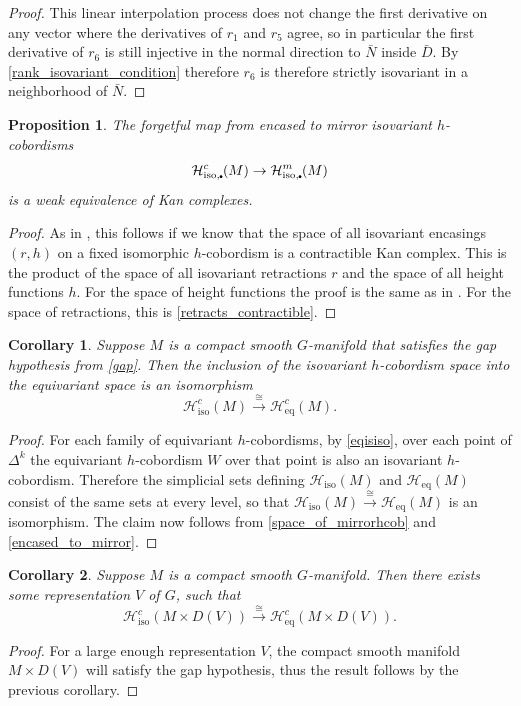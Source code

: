 \documentclass[11pt]{amsart}
\newtheorem{cor}{Corollary}[section]
\newtheorem{prop}{Proposition}[section]
\theoremstyle{definition}
\numberwithin{equation}{section}
\numberwithin{figure}{section}
\newcommand{\mc}{\mathcal}
\newcommand{\Hiso}{\mathcal{H}_{\iso}}
\newcommand{\iso}{\mathrm{iso}}
\newcommand{\eq}{\mathrm{eq}}
\newcommand{\sbt}{\,\begin{picture}(-1,1)(0.5,-1)\circle*{1.8}\end{picture}\hspace{.05cm}}
\begin{document}
\begin{proof}
	This linear interpolation process does not change the first derivative on any vector where the derivatives of $r_1$ and $r_5$ agree, so in particular the first derivative of $r_6$ is still injective in the normal direction to $\bar N$ inside $\bar D$. By \autoref{rank_isovariant_condition} therefore $r_6$ is therefore strictly isovariant in a neighborhood of $\bar N$.
\end{proof}


\begin{prop}\label{encased_to_mirror}
The forgetful map from encased to mirror isovariant $h$-cobordisms
\[ \mc H_{\iso,\sbt}^c(M) \to \mc H_{\iso,\sbt}^m(M) \]
is a weak equivalence of Kan complexes.
\end{prop}

\begin{proof}
As in \cite[Prop 4.16]{GIMM1}, this follows if we know that the space of all isovariant encasings $(r,h)$ on a fixed isomorphic $h$-cobordism is a contractible Kan complex. This is the product of the space of all isovariant retractions $r$ and the space of all height functions $h$. For the space of height functions the proof is the same as in \cite[Prop 4.6]{GIMM1}. For the space of retractions, this is \autoref{retracts_contractible}.
\end{proof}


\begin{cor}\label{heqishiso}
Suppose $M$ is a compact smooth $G$-manifold that satisfies the gap hypothesis from \autoref{gap}. Then the inclusion of the isovariant $h$-cobordism space into the equivariant space is an isomorphism
$$\Hiso^c(M)\xrightarrow{\cong} \mc H_{\eq}^c(M).$$
\end{cor}
\begin{proof}
For each family of equivariant $h$-cobordisms, by \autoref{eqisiso}, over each point of $\Delta^k$ the equivariant $h$-cobordism $W$ over that point is also an isovariant $h$-cobordism. Therefore the simplicial sets defining $\Hiso(M)$ and  $\mc H_{\eq}(M)$ consist of the same sets at every level, so that $\Hiso(M)\xrightarrow{\cong} \mc H_{\eq}(M)$ is an isomorphism. The claim now follows from \autoref{space_of_mirrorhcob} and \autoref{encased_to_mirror}. %
\end{proof}

\begin{cor}\label{heqishisobigV}
Suppose $M$ is a compact smooth $G$-manifold. Then there exists some representation $V$ of $G$, such that$$\Hiso^c(M\times D(V))\xrightarrow{\cong} \mc H_{\eq}^c(M\times D(V)).$$
\end{cor}
\begin{proof}
For a large enough representation $V$, the compact smooth manifold $M\times D(V)$ will satisfy the gap hypothesis, thus the result follows by the previous corollary.\end{proof}
\end{document}
